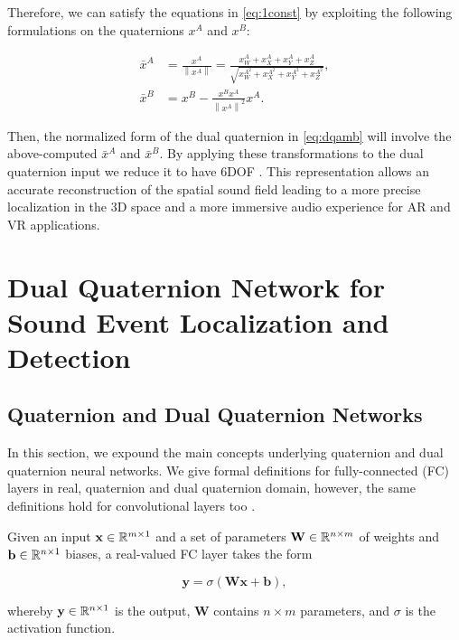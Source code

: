 \documentclass[3p, preprint, twocolumn]{elsarticle}
\begin{document}
\noindent Therefore, we can satisfy the equations in \eqref{eq:1const} by exploiting the following formulations on the quaternions $x^A$ and $x^B$:



\begin{align}
    \bar{x}^{A} &= \frac{x^{A}}{\left\| x^{A}\right\|} = \frac{x_W^{A} + x_X^{A} + x_Y^{A} + x_Z^{A}}{\sqrt{x_{W}^{A^2} + x_{X}^{A^2} + x_{Y}^{A^2} + x_{Z}^{A^2}}}, \\
    \bar{x}^{B} &= x^{B} - \frac{x^{B}x^{A}}{\left\|x^{A}\right\|^2} x^{A}.
\end{align}

\noindent Then, the normalized form of the dual quaternion in \eqref{eq:dqamb} will involve the above-computed $\bar{x}^{A}$ and $\bar{x}^{B}$.
By applying these transformations to the dual quaternion input we reduce it to have 6DOF \cite{McCarthyDualQ1990}. This representation allows an accurate reconstruction of the spatial sound field leading to a more precise localization in the 3D space and a more immersive audio experience for AR and VR applications.


\section{Dual Quaternion Network for Sound Event Localization and Detection}
\label{sec:method}

\subsection{Quaternion and Dual Quaternion Networks}

In this section, we expound the main concepts underlying quaternion and dual quaternion neural networks. We give formal definitions for fully-connected (FC) layers in real, quaternion and dual quaternion domain, however, the same definitions hold for convolutional layers too \cite{GrassucciICASSP2021, GrassucciQGAN2021}.

Given an input $\mathbf{x} \in \mathbb{R}^{m \times 1}$ and a set of parameters $\mathbf{W} \in \mathbb{R}^{n\times m}$ of weights and $\mathbf{b} \in \mathbb{R}^{n \times 1}$ biases, a real-valued FC layer takes the form

\begin{equation}
\label{eq:fclayer}
    \mathbf{y} = \sigma(\mathbf{W}\mathbf{x} + \mathbf{b}),
\end{equation}

\noindent whereby $\mathbf{y} \in \mathbb{R}^{n \times 1}$ is the output, $\mathbf{W}$ contains $n \times m$ parameters, and $\sigma$ is the activation function.
\end{document}
